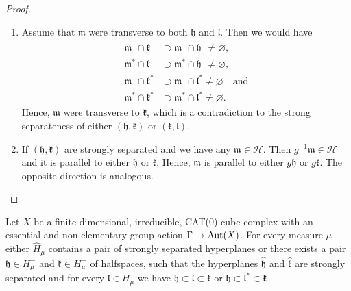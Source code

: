 \begin{proof}
  \begin{enumerate}
  \item Assume that \(\mathfrak{m}\) were transverse to both \(\mathfrak{h}\) and \(\mathfrak{l}\). Then we would have
    \begin{align*}
      \mathfrak{m}^{\phantom{\ast}} \cap \mathfrak{k}^{\phantom{\ast}} & \supset \mathfrak{m}^{\phantom{\ast}} \cap \mathfrak{h}^{\phantom{\ast}} \neq \varnothing,\\
      \mathfrak{m}^\ast \cap \mathfrak{k}^{\phantom{\ast}}  & \supset \mathfrak{m}^\ast \cap \mathfrak{h}^{\phantom{\ast}} \neq \varnothing,\\
      \mathfrak{m}^{\phantom{\ast}} \cap \mathfrak{k}^\ast & \supset \mathfrak{m}^{\phantom{\ast}} \cap \mathfrak{l}^\ast \neq \varnothing\quad \text{and}\\
      \mathfrak{m}^\ast \cap \mathfrak{k}^\ast & \supset \mathfrak{m}^\ast \cap \mathfrak{l}^\ast \neq \varnothing.
    \end{align*}
    Hence, \(\mathfrak{m}\) were transverse to \(\mathfrak{k}\), which is a contradiction to the strong separateness of either \((\mathfrak{h}, \mathfrak{k})\) or \((\mathfrak{k}, \mathfrak{l})\).
  \item If \((\mathfrak{h}, \mathfrak{k})\) are strongly separated and we have any \(\mathfrak{m} \in \mathcal{H}\). Then \(g^{-1}\mathfrak{m} \in \mathcal{H}\) and it is parallel to either \(\mathfrak{h}\) or \(\mathfrak{k}\). Hence, \(\mathfrak{m}\) is parallel to either \(g\mathfrak{h}\) or \(g\mathfrak{k}\). The opposite direction is analogous.
  \end{enumerate}
\end{proof}

\begin{lemma}[{\cite[Lemma~4.19]{MR3509968}}]
  \label{lem:4.19}
  Let \(X\) be a finite-dimensional, irreducible, CAT(0) cube complex with an essential and non-elementary group action \(\Gamma \to \operatorname{Aut}(X)\). For every measure \(\mu\) either \(\hat H_\mu\) contains a pair of strongly separated hyperplanes or there exists a pair \(\mathfrak{h} \in H_\mu^-\) and \(\mathfrak{k} \in H_\mu^+\) of halfspaces, such that the hyperplanes \(\mathfrak{\hat h}\) and \(\mathfrak{\hat k}\) are strongly separated and for every \(\mathfrak{l} \in H_\mu\) we have  \(\mathfrak{h} \subset \mathfrak{l} \subset  \mathfrak{k}\) or \(\mathfrak{h} \subset \mathfrak{l}^\ast \subset \mathfrak{k}\)
\end{lemma}

